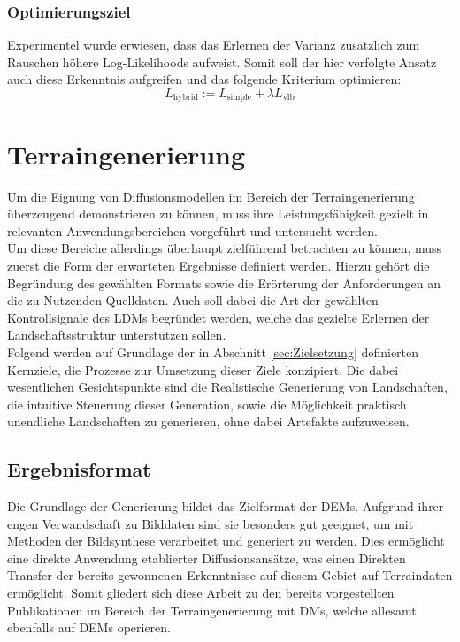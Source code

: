 \subsubsection {Optimierungsziel}

Experimentel wurde erwiesen, dass das Erlernen der Varianz zusätzlich zum Rauschen höhere Log-Likelihoods aufweist. Somit soll der hier verfolgte Ansatz auch diese Erkenntnis aufgreifen und das folgende Kriterium optimieren:
\begin{equation}
    L_\text{hybrid} := L_\text{simple} + \lambda L_\text{vlb}
\end{equation}

\section {Terraingenerierung}
\label{sec:Terraingenerierung}

Um die Eignung von Diffusionsmodellen im Bereich der Terraingenerierung überzeugend demonstrieren zu können, muss ihre Leistungsfähigkeit gezielt in relevanten Anwendungsbereichen vorgeführt und untersucht werden. \\
Um diese Bereiche allerdings überhaupt zielführend betrachten zu können, muss zuerst die Form der erwarteten Ergebnisse definiert werden. Hierzu gehört die Begründung des gewählten Formats sowie die Erörterung der Anforderungen an die zu Nutzenden Quelldaten. Auch soll dabei die Art der gewählten Kontrollsignale des \ac{LDM}s begründet werden, welche das gezielte Erlernen der Landschaftsstruktur unterstützen sollen. \\
Folgend werden auf Grundlage der in Abschnitt \ref{sec:Zielsetzung} definierten Kernziele, die Prozesse zur Umsetzung dieser Ziele konzipiert. Die dabei wesentlichen Gesichtspunkte sind die Realistische Generierung von Landschaften, die intuitive Steuerung dieser Generation, sowie die Möglichkeit praktisch unendliche Landschaften zu generieren, ohne dabei Artefakte aufzuweisen. 

\subsection {Ergebnisformat}
\label{subsec:Ergebnisformat}

Die Grundlage der Generierung bildet das Zielformat der \ac{DEM}s. Aufgrund ihrer engen Verwandschaft zu Bilddaten sind sie besonders gut geeignet, um mit Methoden der Bildsynthese verarbeitet und generiert zu werden. Dies ermöglicht eine direkte Anwendung etablierter Diffusionsansätze, was einen Direkten Transfer der bereits gewonnenen Erkenntnisse auf diesem Gebiet auf Terraindaten ermöglicht. Somit gliedert sich diese Arbeit zu den bereits vorgestellten Publikationen im Bereich der Terraingenerierung mit \ac{DM}s, welche allesamt ebenfalls auf \ac{DEM}s operieren.

